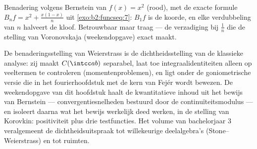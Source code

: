 \begin{omfigure}

{\small Benadering volgens Bernstein van $f(x) = x^2$ (rood), met
de exacte formule $B_nf = x^2 + \frac{x(1-x)}{n}$ uit
\cref{exo:b2:funcseq:7}: $B_1f$ is de koorde, en elke verdubbeling
van $n$ halveert de kloof. Betrouwbaar maar traag --- de
verzadiging bij $\frac1n$ die de stelling van Voronovskaja
(weekendopgave) exact maakt.}
\end{omfigure}

\begin{remark}
De benaderingsstelling van Weierstrass is de dichtheidsstelling van
de klassieke analyse: zij maakt $C(\intcc ab)$ separabel, laat toe
integraalidentiteiten alleen op veeltermen te controleren
(momentenproblemen), en ligt onder de goniometrische versie die in
het fourierhoofdstuk met de kern van Fejér wordt bewezen. De
weekendopgave van dit hoofdstuk haalt de kwantitatieve inhoud uit
het bewijs van Bernstein --- convergentiesnelheden bestuurd door de
continuïteitsmodulus --- en isoleert daarna wat het bewijs werkelijk
deed werken, in de stelling van Korovkin: positiviteit plus drie
testfuncties. Het volume van bachelorjaar 3 veralgemeent de
dichtheidsuitspraak tot willekeurige deelalgebra's
(Stone--Weierstrass) en tot  ruimten.
\end{remark}

